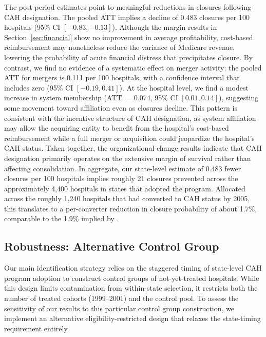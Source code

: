 \documentclass[a4paper, 12pt, twoside]{article}
\begin{document}
The post-period estimates point to meaningful reductions in closures following CAH designation. The pooled ATT implies a decline of 0.483 closures per 100 hospitals (95\% CI $[-0.83, -0.13]$). Although the margin results in Section~\ref{sec:financial} show no improvement in average profitability, cost-based reimbursement may nonetheless reduce the variance of Medicare revenue, lowering the probability of acute financial distress that precipitates closure. By contrast, we find no evidence of a systematic effect on merger activity: the pooled ATT for mergers is 0.111 per 100 hospitals, with a confidence interval that includes zero (95\% CI $[-0.19, 0.41]$). At the hospital level, we find a modest increase in system membership (ATT $= 0.074$, 95\% CI $[0.01, 0.14]$), suggesting some movement toward affiliation even as closures decline. This pattern is consistent with the incentive structure of CAH designation, as system affiliation may allow the acquiring entity to benefit from the hospital's cost-based reimbursement while a full merger or acquisition could jeopardize the hospital's CAH status. Taken together, the organizational-change results indicate that CAH designation primarily operates on the extensive margin of survival rather than affecting consolidation. In aggregate, our state-level estimate of $0.483$ fewer closures per 100 hospitals implies roughly 21 closures prevented across the approximately 4,400 hospitals in states that adopted the program. Allocated across the roughly 1,240 hospitals that had converted to CAH status by 2005, this translates to a per-converter reduction in closure probability of about 1.7\%, comparable to the 1.9\% implied by \cite{carroll2025}.


\subsection{Robustness: Alternative Control Group}
\label{sec:robustness_elig}

Our main identification strategy relies on the staggered timing of state-level CAH program adoption to construct control groups of not-yet-treated hospitals. While this design limits contamination from within-state selection, it restricts both the number of treated cohorts (1999--2001) and the control pool. To assess the sensitivity of our results to this particular control group construction, we implement an alternative eligibility-restricted design that relaxes the state-timing requirement entirely.
\end{document}
